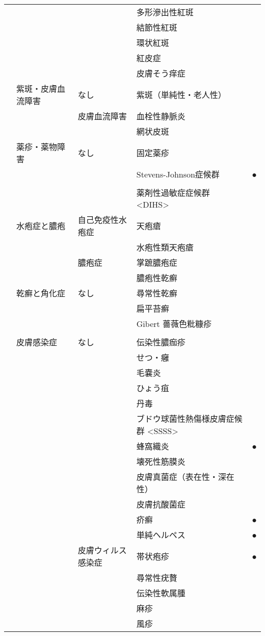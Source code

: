 \begin{xltabular}{\linewidth}{XXXXX}
 &  &  & 多形滲出性紅斑 &  \\
 &  &  & 結節性紅斑 &  \\
 &  &  & 環状紅斑 &  \\
 &  &  & 紅皮症 &  \\
 &  &  & 皮膚そう痒症 &  \\
 & 紫斑・皮膚血流障害 & なし & 紫斑（単純性・老人性） &  \\
 &  & 皮膚血流障害 & 血栓性静脈炎 &  \\
 &  &  & 網状皮斑 &  \\
 & 薬疹・薬物障害 & なし & 固定薬疹 &  \\
 &  &  & Stevens-Johnson症候群 & ● \\
 &  &  &  &  \\
 &  &  & 薬剤性過敏症症候群 <DIHS> &  \\
 & 水疱症と膿疱 & 自己免疫性水疱症 & 天疱瘡 &  \\
 &  &  & 水疱性類天疱瘡 &  \\
 &  & 膿疱症 & 掌蹠膿疱症 &  \\
 &  &  & 膿疱性乾癬 &  \\
 & 乾癬と角化症 & なし & 尋常性乾癬 &  \\
 &  &  & 扁平苔癬 &  \\
 &  &  & Gibert 薔薇色粃糠疹 &  \\
 &  &  &  &  \\
 & 皮膚感染症 & なし & 伝染性膿痂疹 &  \\
 &  &  & せつ・癰 &  \\
 &  &  & 毛嚢炎 &  \\
 &  &  & ひょう疽 &  \\
 &  &  & 丹毒 &  \\
 &  &  & ブドウ球菌性熱傷様皮膚症候群 <SSSS> &  \\
 &  &  & 蜂窩織炎 & ● \\
 &  &  & 壊死性筋膜炎 &  \\
 &  &  & 皮膚真菌症（表在性・深在性） &  \\
 &  &  & 皮膚抗酸菌症 &  \\
 &  &  & 疥癬 & ● \\
 &  &  & 単純ヘルペス & ● \\
 &  & 皮膚ウィルス感染症 & 帯状疱疹 & ● \\
 &  &  & 尋常性疣贅 &  \\
 &  &  & 伝染性軟属腫 &  \\
 &  &  & 麻疹 &  \\
 &  &  & 風疹 &  \\

\end{xltabular}
